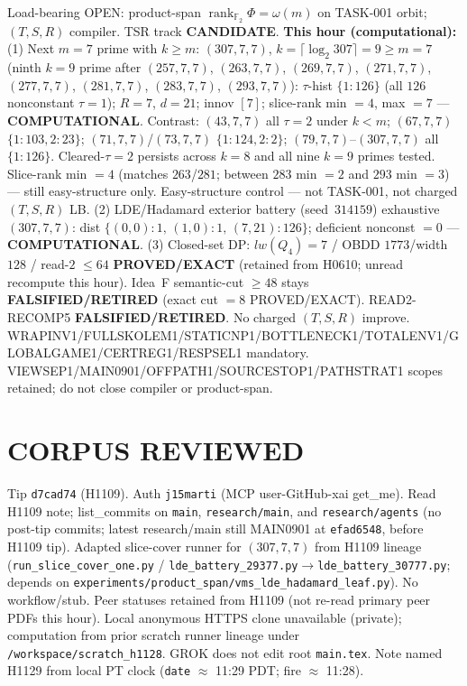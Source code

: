 \documentclass[11pt]{article}
\begin{document}
Load-bearing OPEN: product-span $\operatorname{rank}_{\mathbb F_2}\Phi=\omega(m)$ on TASK-001 orbit;
$(T,S,R)$ compiler. TSR track \textbf{CANDIDATE}.
\textbf{This hour (computational):}
(1) Next $m{=}7$ prime with $k{\ge}m$: $(307,7,7)$, $k=\lceil\log_2 307\rceil=9{\ge}m{=}7$
(ninth $k{=}9$ prime after $(257,7,7)$, $(263,7,7)$, $(269,7,7)$, $(271,7,7)$, $(277,7,7)$, $(281,7,7)$, $(283,7,7)$, $(293,7,7)$):
$\tau$-hist $\{1{:}126\}$ (all $126$ nonconstant $\tau{=}1$); $R{=}7$, $d{=}21$; innov $[7]$;
slice-rank min $=4$, max $=7$ --- \textbf{COMPUTATIONAL}.
Contrast: $(43,7,7)$ all $\tau{=}2$ under $k{<}m$; $(67,7,7)$ $\{1{:}103,2{:}23\}$;
$(71,7,7)$/$(73,7,7)$ $\{1{:}124,2{:}2\}$; $(79,7,7)$--$(307,7,7)$ all $\{1{:}126\}$.
Cleared-$\tau{=}2$ persists across $k{=}8$ and all nine $k{=}9$ primes tested.
Slice-rank min $=4$ (matches $263$/$281$; between $283$ min $=2$ and $293$ min $=3$) --- still easy-structure only.
Easy-structure control --- not TASK-001, not charged $(T,S,R)$ LB.
(2) LDE/Hadamard exterior battery (seed~$314159$) exhaustive $(307,7,7)$:
dist $\{(0,0){:}1,\,(1,0){:}1,\,(7,21){:}126\}$; deficient nonconst $=0$ --- \textbf{COMPUTATIONAL}.
(3) Closed-set DP: $lw(Q_4)=7$ / OBDD $1773$/width $128$ / read-$2$ $\le64$
\textbf{PROVED/EXACT} (retained from H0610; unread recompute this hour).
Idea~F semantic-cut $\ge48$ stays \textbf{FALSIFIED/RETIRED} (exact cut $=8$ PROVED/EXACT).
READ2-RECOMP5 \textbf{FALSIFIED/RETIRED}. No charged $(T,S,R)$ improve.
WRAPINV1/FULLSKOLEM1/STATICNP1/BOTTLENECK1/TOTALENV1/GLOBALGAME1/CERTREG1/RESPSEL1 mandatory.
VIEWSEP1/MAIN0901/OFFPATH1/SOURCESTOP1/PATHSTRAT1 scopes retained; do not close compiler or product-span.

\section*{CORPUS REVIEWED}
Tip \texttt{d7cad74} (H1109). Auth \texttt{j15marti} (MCP user-GitHub-xai get\_me).
Read H1109 note; list\_commits on \texttt{main}, \texttt{research/main}, and \texttt{research/agents}
(no post-tip commits; latest research/main still MAIN0901 at \texttt{efad6548}, before H1109 tip).
Adapted slice-cover runner for $(307,7,7)$ from H1109 lineage
(\texttt{run\_slice\_cover\_one.py} / \texttt{lde\_battery\_29377.py}$\to$\texttt{lde\_battery\_30777.py};
depends on \texttt{experiments/product\_span/vms\_lde\_hadamard\_leaf.py}).
No workflow/stub. Peer statuses retained from H1109 (not re-read primary peer PDFs this hour).
Local anonymous HTTPS clone unavailable (private);
computation from prior scratch runner lineage under \texttt{/workspace/scratch\_h1128}.
GROK does not edit root \texttt{main.tex}.
Note named H1129 from local PT clock (\texttt{date} $\approx$ 11:29 PDT; fire $\approx$ 11:28).
\end{document}
